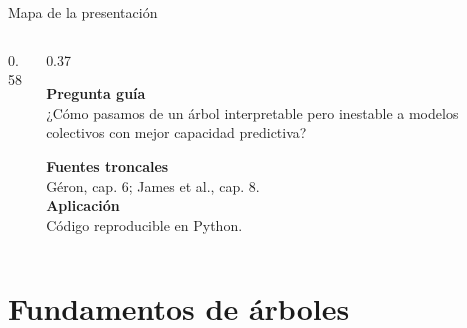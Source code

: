 \documentclass[aspectratio=169,11pt,table]{beamer}
\begin{document}
\begin{frame}{Mapa de la presentación}
\begin{columns}[T,onlytextwidth]
\begin{column}{0.58\textwidth}
\tableofcontents
\end{column}
\begin{column}{0.37\textwidth}
\begin{keybox}
\textbf{Pregunta guía}\\[0.15cm]
¿Cómo pasamos de un árbol interpretable pero inestable a modelos colectivos con mejor capacidad predictiva?
\end{keybox}
\vspace{0.18cm}
\begin{ccdebox}
\small
\textbf{Fuentes troncales}\\
Géron, cap. 6; James et al., cap. 8.\\[0.12cm]
\textbf{Aplicación}\\
Código reproducible en Python.
\end{ccdebox}
\end{column}
\end{columns}
\end{frame}

\section{Fundamentos de árboles}
\end{document}
